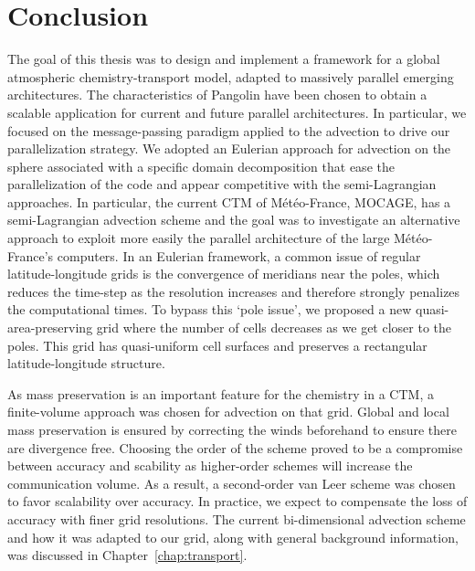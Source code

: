 \chapter*[Conclusion]{Conclusion}

The goal of this thesis was to design and implement a framework for a global
atmospheric chemistry-transport model, adapted to massively parallel emerging
architectures. The characteristics of Pangolin have been chosen to obtain a
scalable application for current and future parallel architectures. In
particular, we focused on the message-passing paradigm applied to the advection
to drive our parallelization strategy.  We adopted an Eulerian approach for
advection on the sphere associated with a specific domain decomposition that
ease the parallelization of the code and appear competitive with the
semi-Lagrangian approaches.  In particular, the current CTM of M\'et\'eo-France,
MOCAGE, has a semi-Lagrangian advection scheme and the goal was to investigate
an alternative approach to exploit more easily the parallel architecture of the
large M\'et\'eo-France's computers. In an Eulerian framework, a common issue of
regular latitude-longitude grids is the convergence of meridians near the poles,
which reduces the time-step as the resolution increases and therefore strongly
penalizes the computational times. To bypass this `pole issue', we proposed a
new quasi-area-preserving grid where the number of cells decreases as we get
closer to the poles. This grid has quasi-uniform cell surfaces and preserves a
rectangular latitude-longitude structure.

As mass preservation is an important feature for the chemistry in a CTM, a
finite-volume approach was chosen for advection on that grid. Global and local
mass preservation is ensured by correcting the winds beforehand to ensure there
are divergence free. Choosing the order of the scheme proved to be a compromise
between accuracy and scability as higher-order schemes will increase the
communication volume. As a result, a second-order van Leer scheme was chosen to
favor scalability over accuracy. In practice, we expect to compensate the loss
of accuracy with finer grid resolutions. The current bi-dimensional advection
scheme and how it was adapted to our grid, along with general background
information, was discussed in Chapter~\ref{chap:transport}.


